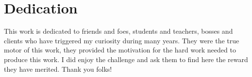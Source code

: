 \section{Dedication}
This work is dedicated to friends and foes, students and teachers, bosses and clients who have triggered my curiosity during many years. They were the true motor of this work, they provided the motivation for the hard work needed to produce this work. I did enjoy the challenge and ask them to find here the reward they have merited. Thank you folks!